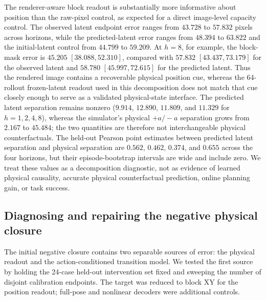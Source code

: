 \documentclass{article}
\begin{document}
The renderer-aware block readout is substantially more informative about
position than the raw-pixel control, as expected for a direct image-level
capacity control. The observed latent endpoint error ranges from $43.728$ to
$57.832$ pixels across horizons, while the predicted-latent error ranges from
$48.394$ to $63.822$ and the initial-latent control from $44.799$ to
$59.209$. At $h=8$, for example, the block-mask error is $45.205$
$[38.088,52.310]$, compared with $57.832$ $[43.437,73.179]$ for the
observed latent and $58.780$ $[45.997,72.615]$ for the predicted latent.
Thus the rendered image contains a recoverable physical position cue, whereas
the 64-rollout frozen-latent readout used in this decomposition does not match
that cue closely enough to serve as a validated physical-state interface. The
predicted latent separation remains
nonzero ($9.914$, $12.890$, $11.809$, and $11.329$ for $h=1,2,4,8$), whereas
the simulator's physical $+a/-a$ separation grows from $2.167$ to $45.484$;
the two quantities are therefore not interchangeable physical
counterfactuals. The held-out Pearson point estimates between predicted
latent separation and physical separation are $0.562$, $0.462$, $0.374$, and
$0.655$ across the four horizons, but their episode-bootstrap intervals are
wide and include zero. We treat these values as a decomposition diagnostic,
not as evidence of learned physical causality, accurate physical
counterfactual prediction, online planning gain, or task success.

\subsection{Diagnosing and repairing the negative physical closure}
\label{sec:supp-negative-closure-diagnosis}

The initial negative closure contains two separable sources of error: the
physical readout and the action-conditioned transition model. We tested the
first source by holding the 24-case held-out intervention set fixed and
sweeping the number of disjoint calibration endpoints. The target was reduced
to block XY for the position readout; full-pose and nonlinear decoders were
additional controls.
\end{document}
